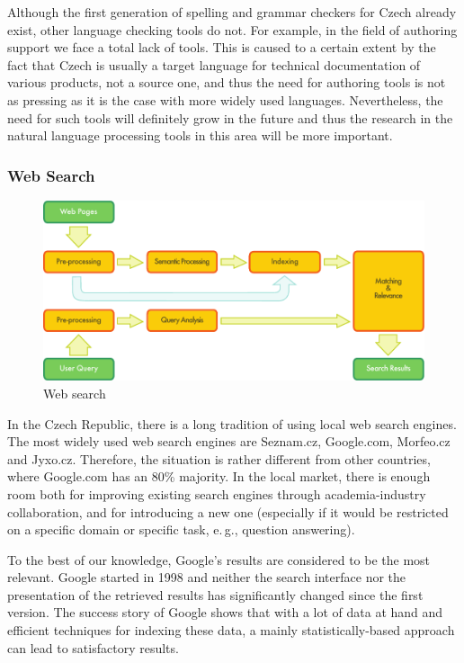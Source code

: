 \begin{multicols}{2}
Although the first generation of spelling and grammar checkers for Czech already exist, other language checking tools do not. For example, in the field of authoring support we face a total lack of tools. This is caused to a certain extent by the fact that Czech is usually a target language for technical documentation of various products, not a source one, and thus the need for authoring tools is not as pressing as it is the case with more widely used languages. Nevertheless, the need for such tools will definitely grow in the future and thus the research in the natural language processing tools in this area will be more important.

\subsubsection{Web Search}

\begin{figure}[htb]
  \center
  \includegraphics[width=\textwidth]{../_media/english/web_search_architecture}
  \caption{Web search}
\label{fig:websearcharch_en}
 \end{figure}

In the Czech Republic, there is a long tradition of using local web search engines. The most widely used web search engines are Seznam.cz, Google.com, Morfeo.cz and Jyxo.cz. Therefore, the situation is rather different from other countries, where Google.com has an 80\% majority. In the local market, there is enough room both for improving existing search engines through academia-industry collaboration, and for introducing a new one (especially if it would be restricted on a specific domain or specific task, e.\,g., question answering).

To the best of our knowledge, Google's results are considered to be the most relevant. Google started in 1998 and neither the search interface nor the presentation of the retrieved results has significantly changed since the first version. The success story of Google shows that with a lot of data at hand and efficient techniques for indexing these data, a mainly statistically-based approach can lead to satisfactory results.


\end{multicols}
